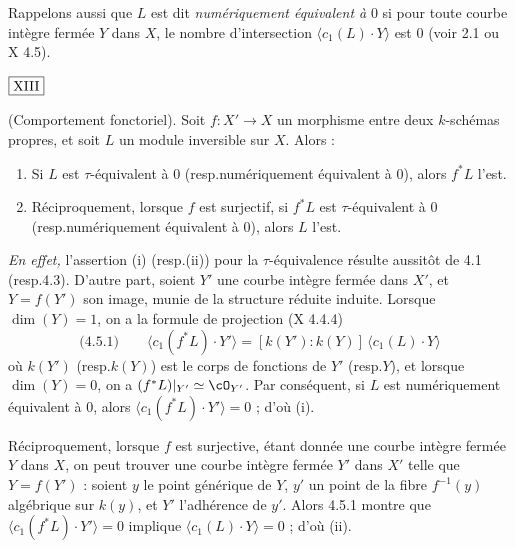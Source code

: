 Rappelons aussi que $L$ est dit \emph{numériquement équivalent à} $0$ si pour toute courbe intègre fermée $Y$ dans $X$, le nombre d'intersection $\langle c_1(L) \cdot Y \rangle$ est $0$ (voir 2.1 ou X 4.5).

\begin{flushright}
$\fbox{\text{XIII}}$
\end{flushright}

\begin{prop}\label{prop:4.5} \textup{(Comportement fonctoriel).} Soit $f : X' \to X$ un morphisme entre deux $k$-schémas propres, et soit $L$ un module inversible sur $X$. Alors :
\begin{enumerate}[label={\roman*)}]
\item Si $L$ est $\tau$-équivalent à $0$ (resp.\@ numériquement équivalent à $0$), alors $f^*L$ l'est.
\item Réciproquement, lorsque $f$ est surjectif, si $f^*L$ est $\tau$-équivalent à $0$ (resp.\@ numériquement équivalent à $0$), alors $L$ l'est.
\end{enumerate}
\end{prop}

\noindent\textit{En effet,} l'assertion (i) (resp.\@ (ii)) pour la $\tau$-équivalence résulte aussitôt de 4.1 (resp.\@ 4.3). D'autre part, soient $Y'$ une courbe intègre fermée dans $X'$, et $Y = f(Y')$ son image, munie de la structure réduite induite. Lorsque $\dim(Y) = 1$, on a la formule de projection (X 4.4.4)
\[
\text{(4.5.1)} \qquad \langle c_1(f^*L) \cdot Y' \rangle = [k(Y') : k(Y)] \, \langle c_1(L) \cdot Y \rangle
\]
où $k(Y')$ (resp.\@ $k(Y)$) est le corps de fonctions de $Y'$ (resp.\@ $Y$), et lorsque $\dim(Y) = 0$, on a $(f^*L)|_{Y'} \simeq \cO_{Y'}$. Par conséquent, si $L$ est numériquement équivalent à $0$, alors $\langle c_1(f^*L) \cdot Y' \rangle = 0$ ; d'où (i).

Réciproquement, lorsque $f$ est surjective, étant donnée une courbe intègre fermée $Y$ dans $X$, on peut trouver une courbe intègre fermée $Y'$ dans $X'$ telle que $Y = f(Y')$ : soient $y$ le point générique de $Y$, $y'$ un point de la fibre $f^{-1}(y)$ algébrique sur $k(y)$, et $Y'$ l'adhérence de $y'$. Alors 4.5.1 montre que $\langle c_1(f^*L) \cdot Y' \rangle = 0$ implique $\langle c_1(L) \cdot Y \rangle = 0$ ; d'où (ii).

